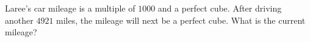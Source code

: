 Laree's car mileage is a multiple of $1000$ and a perfect cube. After driving another $4921$ miles, the mileage will next be a perfect cube. What is the current mileage?
